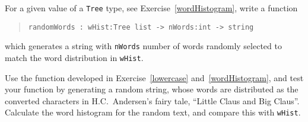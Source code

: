 For a given value of a \lstinline!Tree! type, see
Exercise~\ref{wordHistogram}, write a function
\begin{quote}
  \mbox{\lstinline!randomWords : wHist:Tree list -> nWords:int -> string!}
\end{quote}
which generates a string with \lstinline!nWords! number of words
randomly selected to match the word distribution in
\lstinline!wHist!.

Use the function developed in Exercise~\ref{lowercase} and~\ref{wordHistogram}, and test
your function by generating a random string, whose words are
distributed as the converted characters in H.C.\ Andersen's fairy
tale, ``Little Claus and Big Claus''. Calculate the word histogram for
the random text, and compare this with \lstinline{wHist}.
